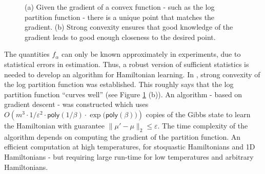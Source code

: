 \documentclass[11pt]{article}
\newcommand{\poly}{\ensuremath{\mathsf{poly}}}
\begin{document}
\begin{figure}
\centering
\begin{subfigure}[b]{0.4\textwidth}
\centering
{}
\caption{}
\end{subfigure}
\hspace{1cm}
\begin{subfigure}[b]{0.4\textwidth}
\centering
{}
\caption{}
\end{subfigure}
\caption{(a) Given the gradient of a convex function - such as the log partition function - there is a unique point that matches the gradient. (b) Strong convexity ensures that good knowledge of the gradient leads to good enough closeness to the desired point.}
\label{fig:gradientpf}
\end{figure}

The quantities $f_\alpha$ can only be known approximately in experiments, due to statistical errors in estimation. Thus, a robust version of sufficient statistics is needed to develop an  algorithm for Hamiltonian learning. In \cite{anshu2021sample}, strong convexity of the log partition function was established. This roughly says that the log partition function ``curves well'' (see Figure \ref{fig:gradientpf} (b)). An algorithm - based on gradient descent - was constructed which uses  $O\left(m^3\cdot 1/\varepsilon^2\cdot \poly(1/\beta)\cdot {\exp(\poly(\beta)})\right)$ copies of the Gibbs state to learn the Hamiltonian with guarantee $\|\mu'-\mu\|_2\leq \varepsilon$. The time complexity of the algorithm depends on computing the gradient of the partition function. An efficient computation at high temperatures, for stoquastic Hamiltonians and 1D Hamiltonians - but requiring large run-time for low temperatures and arbitrary Hamiltonians. 
\end{document}
